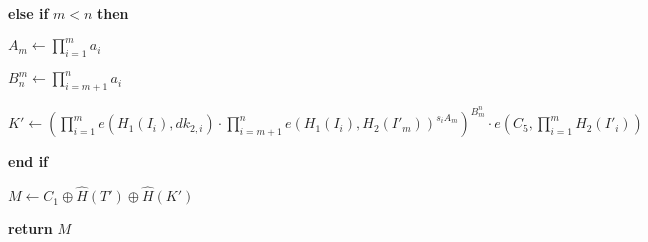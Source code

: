 \documentclass[a4paper]{article}
\begin{document}
\textbf{else if} $m < n$ \textbf{then}

\quad$A_m \gets \prod\limits_{i = 1}^m a_i$

\quad$B_n^m \gets \prod\limits_{i = m + 1}^n a_i$

\quad$K' \gets
(
\prod\limits_{i = 1}^m e(H_1(I_i), \textit{dk}_{2, i})
\cdot \prod\limits_{i = m + 1}^n e(H_1(I_i), H_2(I'_m))^{s_i A_m}
)^{B_m^n}
\cdot e(C_5, \prod\limits_{i = 1}^m H_2(I'_i))
$

\textbf{end if}

$M \gets C_1 \oplus \hat{H}(T') \oplus \hat{H}(K')$

\textbf{return} $M$
\end{document}
